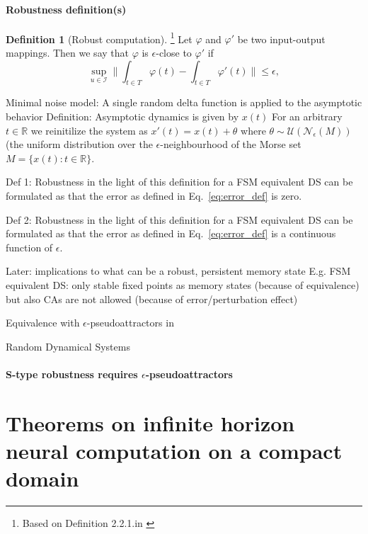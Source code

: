 \documentclass{scrartcl}
\theoremstyle{definition}
\newtheorem{definition}{Definition}
\theoremstyle{remark}
\newcommand{\reals}{\mathbb{R}}
\begin{document}
\paragraph{Robustness definition(s)}

\begin{definition}[Robust computation]\footnote{Based on Definition 2.2.1.in \citep{kuehn2015}}
 Let $\varphi$ and $\varphi'$ be two input-output mappings.
  Then we say that $\varphi$ is $\epsilon$-close to $\varphi'$ if
\begin{equation}\label{eq:error_def}
\sup_{u\in \mathcal{I}}\|\int_{t\in T}\varphi(t) - \int_{t\in T}\varphi'(t)\|  \leq \epsilon,
\end{equation}
\end{definition}


Minimal noise model: 
A single random delta function is applied to the asymptotic behavior
Definition:
Asymptotic dynamics is given by $x(t)$
For an arbitrary $t \in \reals$ we reinitilize the system as $x'(t)=x(t) + \theta$ where $\theta\sim \mathcal{U}(\mathcal{N}_\epsilon(M))$ (the uniform distribution over the $\epsilon$-neighbourhood of the Morse set $M=\{x(t)\colon t\in \reals\}$.

Def 1: Robustness in the light of this definition for a FSM equivalent DS can be formulated as that the error as defined in Eq.~\ref{eq:error_def} is zero.

Def 2: Robustness in the light of this definition for a FSM equivalent DS can be formulated as that the error as defined in Eq.~\ref{eq:error_def} is a continuous function of $\epsilon$.

Later: implications to what can be a robust, persistent memory state
E.g.  FSM equivalent DS: only stable fixed points as memory states (because of equivalence)
but also CAs are not allowed (because of error/perturbation effect)


Equivalence with $\epsilon$-pseudoattractors in \citep{casey1996}


Random Dynamical Systems
\citep{homburg2013bifurcations}


\paragraph{S-type robustness requires $\epsilon$-pseudoattractors}



\section{Theorems on infinite horizon neural computation on a compact domain}\label{sec:theorems}
\end{document}
